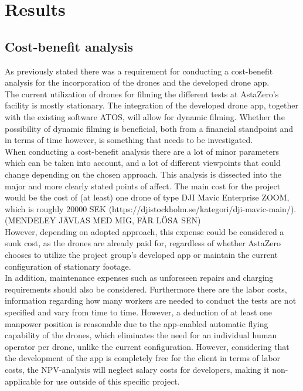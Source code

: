 \chapter{Results}

\section{Cost-benefit analysis} \label{Cost-benefit}
As previously stated there was a requirement for conducting a cost-benefit analysis for the incorporation of the drones and the developed drone app. 
\\

The current utilization of drones for filming the different tests at AstaZero’s facility is mostly stationary. The integration of the developed drone app, together with the existing software ATOS, will allow for dynamic filming. Whether the possibility of dynamic filming is beneficial, both from a financial standpoint and in terms of time however, is something that needs to be investigated. 
\\

When conducting a cost-benefit analysis there are a lot of minor parameters which can be taken into account, and a lot of different viewpoints that could change depending on the chosen approach. This analysis is dissected into the major and more clearly stated points of affect. 
The main cost for the project would be the cost of (at least) one drone of type DJI Mavic Enterprise ZOOM, which is roughly 20000 SEK (https://djistockholm.se/kategori/dji-mavic-main/).(MENDELEY JÄVLAS MED MIG, FÅR LÖSA SEN)
\\

However, depending on adopted approach, this expense could be considered a sunk cost, as the drones are already paid for, regardless of whether AstaZero chooses to utilize the project group's developed app or maintain the current configuration of stationary footage.
\\

In addition, maintenance expenses such as unforeseen repairs and charging requirements should also be considered.
Furthermore there are the labor costs, information regarding how many workers are needed to conduct the tests are not specified and vary from time to time. However, a deduction of at least one manpower position is reasonable due to the app-enabled automatic flying capability of the drones, which eliminates the need for an individual human operator per drone, unlike the current configuration. However, considering that the development of the app is completely free for the client in terms of labor costs, the NPV-analysis will neglect salary costs for developers, making it non-applicable for use outside of this specific project.  
\\

